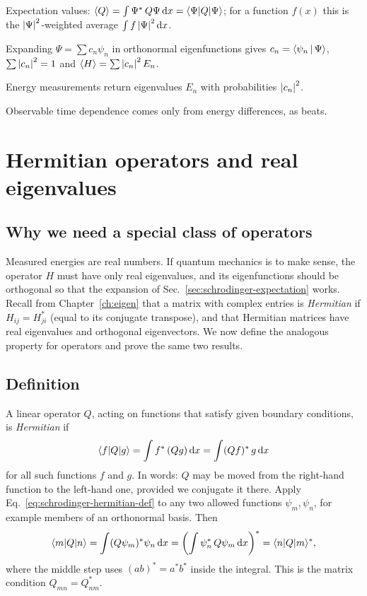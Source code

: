 \begin{keyideas}
\item Expectation values: $\langle Q\rangle=\int\Psi^*\,Q\Psi\,\mathrm{d} x=\langle \Psi| Q|\Psi\rangle$; for a function $f(x)$ this is the $\left\lvert \Psi\right\rvert^2$-weighted average $\int f\left\lvert \Psi\right\rvert^2\mathrm{d} x$.
\item Expanding $\Psi=\sum c_n\psi_n$ in orthonormal eigenfunctions gives $c_n=\langle \psi_n\,|\,\Psi\rangle$, $\sum\left\lvert c_n\right\rvert^2=1$ and $\langle H\rangle=\sum\left\lvert c_n\right\rvert^2E_n$.
\item Energy measurements return eigenvalues $E_n$ with probabilities $\left\lvert c_n\right\rvert^2$.
\item Observable time dependence comes only from energy differences, as beats.
\end{keyideas}

\section{Hermitian operators and real eigenvalues}\label{sec:schrodinger-hermitian}

\subsection{Why we need a special class of operators}

Measured energies are real numbers. If quantum mechanics is to make sense, the operator $H$ must have only real eigenvalues, and its eigenfunctions should be orthogonal so that the expansion of Sec.~\ref{sec:schrodinger-expectation} works. Recall from Chapter~\ref{ch:eigen} that a matrix with complex entries is \emph{Hermitian} if $H_{ij}=H_{ji}^*$ (equal to its conjugate transpose), and that Hermitian matrices have real eigenvalues and orthogonal eigenvectors. We now define the analogous property for operators and prove the same two results.

\subsection{Definition}

A linear operator $Q$, acting on functions that satisfy given boundary conditions, is \emph{Hermitian} if
\begin{equation}
\langle f|Q|g\rangle=\int f^*\,(Qg)\,\mathrm{d} x=\int (Qf)^*\,g\,\mathrm{d} x
\label{eq:schrodinger-hermitian-def}
\end{equation}
for all such functions $f$ and $g$. In words: $Q$ may be moved from the right-hand function to the left-hand one, provided we conjugate it there. Apply Eq.~\eqref{eq:schrodinger-hermitian-def} to any two allowed functions $\psi_m,\psi_n$, for example members of an orthonormal basis. Then
\[
\langle m|Q|n\rangle=\int(Q\psi_m)^*\psi_n\,\mathrm{d} x=\left(\int\psi_n^*\,Q\psi_m\,\mathrm{d} x\right)^*=\langle n|Q|m\rangle^*,
\]
where the middle step uses $(ab)^*=a^*b^*$ inside the integral. This is the matrix condition $Q_{mn}=Q_{nm}^*$.

